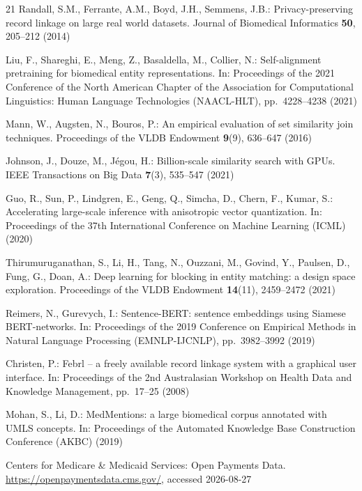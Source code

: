\documentclass[runningheads]{llncs}
\begin{document}
\begin{thebibliography}{21}
Randall, S.M., Ferrante, A.M., Boyd, J.H., Semmens, J.B.: Privacy-preserving record linkage on large real world datasets. Journal of Biomedical Informatics \textbf{50}, 205--212 (2014)

Liu, F., Shareghi, E., Meng, Z., Basaldella, M., Collier, N.: Self-alignment pretraining for biomedical entity representations. In: Proceedings of the 2021 Conference of the North American Chapter of the Association for Computational Linguistics: Human Language Technologies (NAACL-HLT), pp.~4228--4238 (2021)

Mann, W., Augsten, N., Bouros, P.: An empirical evaluation of set similarity join techniques. Proceedings of the VLDB Endowment \textbf{9}(9), 636--647 (2016)

Johnson, J., Douze, M., J\'egou, H.: Billion-scale similarity search with GPUs. IEEE Transactions on Big Data \textbf{7}(3), 535--547 (2021)

Guo, R., Sun, P., Lindgren, E., Geng, Q., Simcha, D., Chern, F., Kumar, S.: Accelerating large-scale inference with anisotropic vector quantization. In: Proceedings of the 37th International Conference on Machine Learning (ICML) (2020)

Thirumuruganathan, S., Li, H., Tang, N., Ouzzani, M., Govind, Y., Paulsen, D., Fung, G., Doan, A.: Deep learning for blocking in entity matching: a design space exploration. Proceedings of the VLDB Endowment \textbf{14}(11), 2459--2472 (2021)

Reimers, N., Gurevych, I.: Sentence-BERT: sentence embeddings using Siamese BERT-networks. In: Proceedings of the 2019 Conference on Empirical Methods in Natural Language Processing (EMNLP-IJCNLP), pp.~3982--3992 (2019)

Christen, P.: Febrl -- a freely available record linkage system with a graphical user interface. In: Proceedings of the 2nd Australasian Workshop on Health Data and Knowledge Management, pp.~17--25 (2008)

Mohan, S., Li, D.: MedMentions: a large biomedical corpus annotated with UMLS concepts. In: Proceedings of the Automated Knowledge Base Construction Conference (AKBC) (2019)

Centers for Medicare \& Medicaid Services: Open Payments Data.
\url{https://openpaymentsdata.cms.gov/}, accessed 2026-08-27


\end{thebibliography}
\end{document}
